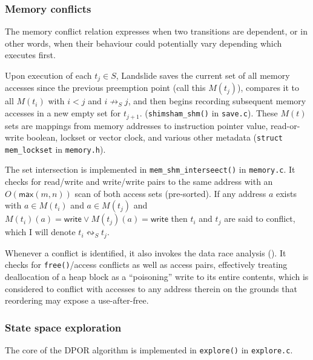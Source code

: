 \subsubsection{Memory conflicts}

The memory conflict relation expresses when two transitions are dependent,
or in other words, when their behaviour could potentially vary depending which executes first.

Upon execution of each $t_j \in S$,
Landslide saves the current set of all memory accesses since the previous preemption point (call this $M(t_j)$),
compares it to all $M(t_i)$ with $i < j$ and $i \not\rightarrow_S j$,
and then begins recording subsequent memory accesses in a new empty set for $t_{j+1}$.
({\tt shimsham\_shm()} in {\tt save.c}).
These $M(t)$ sets are mappings from memory addresses to
instruction pointer value, read-or-write boolean, lockset or vector clock, and various other metadata
({\tt struct mem\_lockset} in {\tt memory.h}).

The set intersection is implemented in {\tt mem\_shm\_interseect()} in {\tt memory.c}.
It checks for read/write and write/write pairs to the same address with an $O(\mathsf{max}(m,n))$ scan of both access sets (pre-sorted).
If any address $a$ exists with $a \in M(t_i)$ and $a \in M(t_j)$ and $M(t_i)(a) = \mathsf{write} \vee M(t_j)(a) = \mathsf{write}$
then $t_i$ and $t_j$ are said to conflict,
which I will denote $t_i \leftrightsquigarrow_S t_j$.

Whenever a conflict is identified, it also invokes the data race analysis (\sect{\ref{sec:landslide-datarace}}).
It checks for {\tt free()}/access conflicts as well as access pairs,
effectively treating deallocation of a heap block as a ``poisoning'' write to its entire contents,
which is considered to conflict with accesses to any address therein
on the grounds that reordering may expose a use-after-free.

\subsubsection{State space exploration}

The core of the DPOR algorithm is implemented in {\tt explore()} in {\tt explore.c}.

